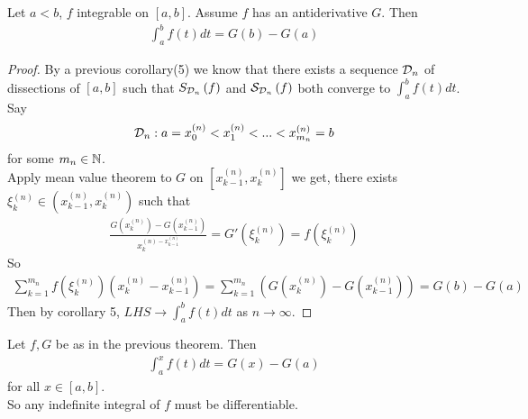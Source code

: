 \documentclass[a4paper]{article}
\begin{document}
\begin{thm}
Let $a<b$, $f$ integrable on $\left[a,b\right]$. Assume $f$ has an antiderivative $G$. Then
\begin{equation*}
\begin{aligned}
\int_a^b f\left(t\right) dt = G\left(b\right) - G\left(a\right)
\end{aligned}
\end{equation*}
\begin{proof}
By a previous corollary(5) we know that there exists a sequence $\mathcal{D}_n$ of dissections of $\left[a,b\right]$ such that $S_{\mathcal{D}_n} \left(f\right)$ and $\mathcal{S}_{\mathcal{D}_n} \left(f\right)$ both converge to $\int_a^b f\left(t\right) dt$.\\
Say
\begin{equation*}
\begin{aligned}
\mathcal{D}_n: a=x_0^{\left(n\right)} < x_1^{\left(n\right)} < ... < x_{m_n}^{\left(n\right)} = b
\end{aligned}
\end{equation*}
for some $m_n \in \mathbb{N}$.\\
Apply mean value theorem to $G$ on $\left[x_{k-1}^{\left(n\right)},x_k^{\left(n\right)}\right]$ we get, there exists $\xi_k^{\left(n\right)} \in \left(x_{k-1}^{\left(n\right)},x_k^{\left(n\right)}\right)$ such that
\begin{equation*}
\begin{aligned}
\frac{G\left(x_k^{\left(n\right)}\right) - G \left(x_{k-1}^{\left(n\right)}\right)}{x_k^{\left(n\right)-x_{k-1}^{\left(n\right)}}}=G'\left(\xi_k^{\left(n\right)}\right) = f\left(\xi_k^{\left(n\right)}\right)
\end{aligned}
\end{equation*}
So
\begin{equation*}
\begin{aligned}
\sum_{k=1}^{m_n} f\left(\xi_k^{\left(n\right)}\right) \left(x_k^{\left(n\right)}-x_{k-1}^{\left(n\right)}\right)
=\sum_{k=1}^{m_n} \left(G\left(x_k^{\left(n\right)}\right) - G \left(x_{k-1}^{\left(n\right)}\right)\right) = G\left(b\right) - G\left(a\right)
\end{aligned}
\end{equation*}
Then by corollary 5, $LHS \to \int_a^b f\left(t\right)dt$ as $n\to\infty$.
\end{proof}
\end{thm}

\begin{rem}
Let $f,G$ be as in the previous theorem. Then
\begin{equation*}
\begin{aligned}
\int_a^x f\left(t\right) dt = G\left(x\right) - G\left(a\right)
\end{aligned}
\end{equation*}
for all $x\in\left[a,b\right]$.\\
So any indefinite integral of $f$ must be differentiable.
\end{rem}
\end{document}
